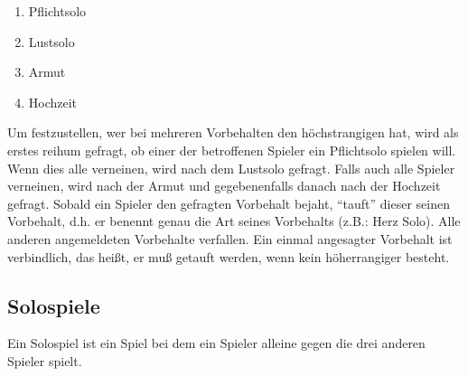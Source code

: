 \documentclass{scrartcl}
\begin{document}
\begin{enumerate}
  \item Pflichtsolo
  \item Lustsolo
  \item Armut
  \item Hochzeit
\end{enumerate}

Um festzustellen, wer bei mehreren Vorbehalten den höchstrangigen hat, wird als erstes reihum gefragt, ob einer der betroffenen Spieler ein Pflichtsolo spielen will. Wenn dies alle verneinen, wird nach dem Lustsolo gefragt. Falls auch alle Spieler verneinen, wird nach der Armut und gegebenenfalls danach nach der Hochzeit gefragt. Sobald ein Spieler den gefragten Vorbehalt bejaht, "`tauft"' dieser seinen Vorbehalt, d.h. er benennt genau die Art seines Vorbehalts (z.B.: Herz Solo). Alle anderen angemeldeten Vorbehalte verfallen. Ein einmal angesagter Vorbehalt ist verbindlich, das heißt, er muß getauft werden, wenn kein höherrangiger besteht.

\subsection{\label{solo}Solospiele}
Ein Solospiel ist ein Spiel bei dem ein Spieler alleine gegen die drei anderen Spieler spielt.
\end{document}
